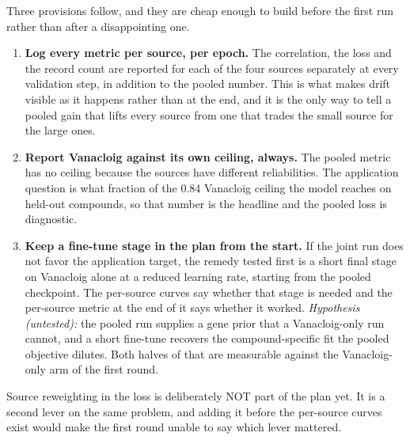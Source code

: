 Three provisions follow, and they are cheap enough to build before the first run rather than
after a disappointing one.

\begin{enumerate}
\item \textbf{Log every metric per source, per epoch.} The correlation, the loss and the
  record count are reported for each of the four sources separately at every validation step,
  in addition to the pooled number. This is what makes drift visible as it happens rather than
  at the end, and it is the only way to tell a pooled gain that lifts every source from one
  that trades the small source for the large ones.
\item \textbf{Report Vanacloig against its own ceiling, always.} The pooled metric has no
  ceiling because the sources have different reliabilities. The application question is what
  fraction of the 0.84 Vanacloig ceiling the model reaches on held-out compounds, so that
  number is the headline and the pooled loss is diagnostic.
\item \textbf{Keep a fine-tune stage in the plan from the start.} If the joint run does not
  favor the application target, the remedy tested first is a short final stage on Vanacloig
  alone at a reduced learning rate, starting from the pooled checkpoint. The per-source curves
  say whether that stage is needed and the per-source metric at the end of it says whether it
  worked. \textit{Hypothesis (untested):} the pooled run supplies a gene prior that a
  Vanacloig-only run cannot, and a short fine-tune recovers the compound-specific fit the
  pooled objective dilutes. Both halves of that are measurable against the
  Vanacloig-only arm of the first round.
\end{enumerate}

Source reweighting in the loss is deliberately NOT part of the plan yet. It is a second lever
on the same problem, and adding it before the per-source curves exist would make the first
round unable to say which lever mattered.

